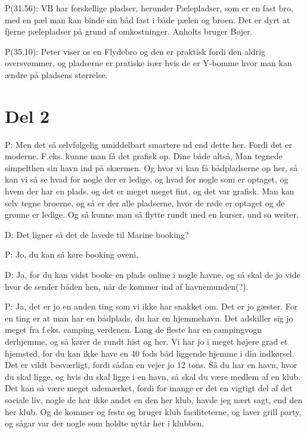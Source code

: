 P(31.56): VB har forskellige pladser, herunder Pælepladser, som er en fast bro, med en pæl man kan binde sin båd fast i både pælen og broen. Det er dyrt at fjerne pælepladser på grund af omkostninger. Anholts bruger Bøjer.

P(35.10): Peter viser os en Flydebro og den er praktisk fordi den aldrig oversvømmer, og pladserne er pratiske især hvis de er Y-bomme hvor man kan ændre på pladsens størrelse.







\section{Del 2}

P: Men det så selvfølgelig umiddelbart smartere ud end dette her. Fordi det er moderne. F.eks. kunne man få det grafisk op. Dine både altså, Man tegnede simpelthen sin havn ind på skærmen. Og hvor vi kan få bådpladserne op her, så kan vi så se hvad for nogle der er ledige, og hvad for nogle som er optaget, og hvem der har en plads. og det er meget meget fint, og det var grafisk. Man kan selv tegne broerne, og så er der alle pladserne, hvor de røde er optaget og de grønne er ledige. Og så kunne man så flytte rundt med en kurser, und so weiter.

D: Det ligner så det de lavede til Marine booking?

P: Jo, du kan så køre booking oveni.

D: Ja, for du kan vidst booke en plads online i nogle havne, og så skal de jo vide hvor de sender båden hen, når de kommer ind af havnemunden(?).

P: Ja, det er jo en anden ting som vi ikke har snakket om. Det er jo gæster. For en ting er at man har en bådplads, du har en hjemmehavn. Det adskiller sig jo meget fra f.eks. camping verdenen. Lang de fleste har en campingvogn derhjemme, og så kører de rundt hist og her. Vi har jo i meget højere grad et hjemsted, for du kan ikke have en 40 fods båd liggende hjemme i din indkørsel. Det er vildt besværligt, fordi sådan en vejer jo 12 tons. Så du har en havn, hvor du skal ligge, og hvis du skal ligge i en havn, så skal du være medlem af en klub. Det kan så være meget udemærket, fordi for mange er det en vigtigt del af det sociale liv, nogle de har ikke andet en den her klub, havde jeg nært sagt, end den her klub. Og de kommer og feste og bruger klub faciliteterne, og laver grill party, og sågar var der nogle som holdte nytår her i klubben.

